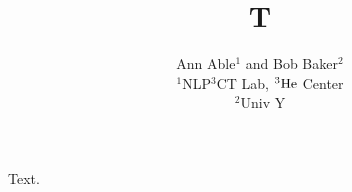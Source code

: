 \documentclass{article}
\begin{document}
\title{T}
\author{Ann Able$^{1}$ and Bob Baker$^{2}$\\ $^{1}$NLP$^{3}$CT Lab, ${\rm ^{3}He}$ Center\\ $^{2}$Univ Y}
\maketitle
Text.
\end{document}
